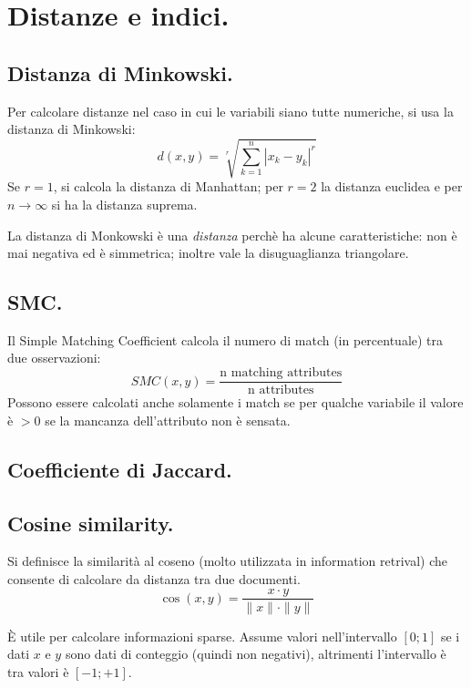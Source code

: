 \documentclass[11pt, a4page, twocolumn]{article}
\begin{document}
\section{Distanze e indici.}
\subsection{Distanza di Minkowski.}
Per calcolare distanze nel caso in cui le variabili siano tutte numeriche, si usa la distanza di Minkowski:
\begin{equation*}
d(x, y) = \sqrt[r]{\sum^{n}_{k=1}{|x_k - y_k|^r}}
\end{equation*}
Se $r = 1$, si calcola la distanza di Manhattan; per $r = 2$ la distanza euclidea e per $n \to \infty$ si ha la distanza suprema.

La distanza di Monkowski è una \textit{distanza} perchè ha alcune caratteristiche: non è mai negativa ed è simmetrica; inoltre vale la disuguaglianza triangolare.

\subsection{SMC.}
Il Simple Matching Coefficient calcola il numero di match (in percentuale) tra due osservazioni:
\begin{equation*}
SMC(x, y) = \frac{\text{n matching attributes}}{\text{n attributes}}
\end{equation*}
Possono essere calcolati anche solamente i match se per qualche variabile il valore è $> 0$ se la mancanza dell'attributo non è sensata.

\subsection{Coefficiente di Jaccard.}

\subsection{Cosine similarity.}
Si definisce la similarità al coseno (molto utilizzata in information retrival) che consente di calcolare da distanza tra due documenti.
\begin{equation*}
\cos(x, y) = \frac{x \cdot y}{\|x\| \cdot \|y\|}
\end{equation*}

È utile per calcolare informazioni sparse.
Assume valori nell'intervallo $[0;1]$ se i dati $x$ e $y$ sono dati di conteggio (quindi non negativi), altrimenti l'intervallo è tra valori è $[-1;+1]$.
\end{document}
